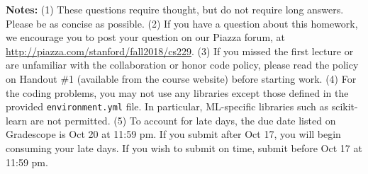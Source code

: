 {\bf Notes:} (1) These questions require thought, but do not require long
answers. Please be as concise as possible.  (2) If you have a question
about this homework, we encourage you to post your question on our
Piazza forum, at \url{http://piazza.com/stanford/fall2018/cs229}. (3) If you
missed the first lecture or are unfamiliar with the collaboration or honor
code policy, please read the policy on Handout \#1 (available from the
course website) before starting work. (4) For the coding problems, you may not
use any libraries except those defined in the provided \texttt{environment.yml}
file. In particular, ML-specific libraries such as scikit-learn are not
permitted. (5) To account for late days, the due date listed on Gradescope is
Oct 20 at 11:59 pm. If you submit after Oct 17, you will begin consuming your
late days. If you wish to submit on time, submit before Oct 17 at 11:59 pm.
